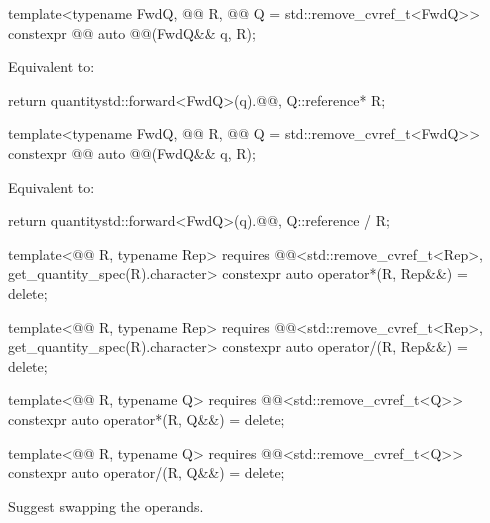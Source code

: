 \begin{itemdecl}
template<typename FwdQ, @@ R, @@ Q = std::remove_cvref_t<FwdQ>>
constexpr @@ auto @@(FwdQ&& q, R);
\end{itemdecl}

\begin{itemdescr}
\pnum
\effects
Equivalent to:
\begin{codeblock}
return quantity{std::forward<FwdQ>(q).@@, Q::reference* R{}};
\end{codeblock}
\end{itemdescr}

\begin{itemdecl}
template<typename FwdQ, @@ R, @@ Q = std::remove_cvref_t<FwdQ>>
constexpr @@ auto @@(FwdQ&& q, R);
\end{itemdecl}

\begin{itemdescr}
\pnum
\effects
Equivalent to:
\begin{codeblock}
return quantity{std::forward<FwdQ>(q).@@, Q::reference / R{}};
\end{codeblock}
\end{itemdescr}

\begin{itemdecl}
template<@@ R, typename Rep>
  requires @@<std::remove_cvref_t<Rep>, get_quantity_spec(R{}).character>
constexpr auto operator*(R, Rep&&) = delete;

template<@@ R, typename Rep>
  requires @@<std::remove_cvref_t<Rep>, get_quantity_spec(R{}).character>
constexpr auto operator/(R, Rep&&) = delete;

template<@@ R, typename Q>
  requires @@<std::remove_cvref_t<Q>>
constexpr auto operator*(R, Q&&) = delete;

template<@@ R, typename Q>
  requires @@<std::remove_cvref_t<Q>>
constexpr auto operator/(R, Q&&) = delete;
\end{itemdecl}

\begin{itemdescr}
\pnum
\recommended
Suggest swapping the operands.
\end{itemdescr}

